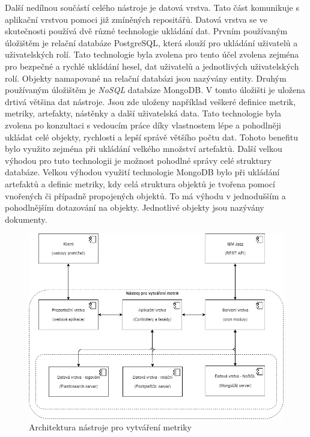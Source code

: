 \documentclass[czech,master]{diploma}
\begin{document}
Další nedílnou součástí celého nástroje je datová vrstva. Tato část komunikuje s aplikační vrstvou pomoci již zmíněných repositářů. Datová vrstva se ve skutečnosti používá dvě různé technologie ukládání dat. Prvním používaným úložištěm je relační databáze PostgreSQL, která slouží pro ukládání uživatelů a uživatelských rolí. Tato technologie byla zvolena pro tento účel zvolena zejména pro bezpečné a rychlé ukládání hesel, dat uživatelů a jednotlivých uživatelských rolí. Objekty namapované na relační databázi jsou nazývány entity. Druhým používaným úložištěm je \textit{NoSQL} databáze MongoDB. V tomto úložišti je uložena drtivá většina dat nástroje. Jsou zde uloženy například veškeré definice metrik, metriky, artefakty, nástěnky a další uživatelská data. Tato technologie byla zvolena po konzultaci s vedoucím práce díky vlastnostem lépe a pohodlněji ukládat celé objekty, rychlosti a lepší správě většího počtu dat. Tohoto benefitu bylo využito zejména při ukládání velkého množství artefaktů. Další velkou výhodou pro tuto technologii je možnost pohodlné správy celé struktury databáze. Velkou výhodou využití technologie MongoDB bylo při ukládání artefaktů a definic metriky, kdy celá struktura objektů je tvořena pomocí vnořených či případně propojených objektů. To má výhodu v jednodušším a pohodlnějším dotazování na objekty. Jednotlivé objekty jsou nazývány dokumenty.



\begin{figure}[!ht]
    \centering
    \includegraphics[width=1\textwidth]{Diplomka/Figures/architektura.png}
    \caption{Architektura nástroje pro vytváření metriky}
    \label{fig:architektura_nastroje}
\end{figure}
\end{document}
